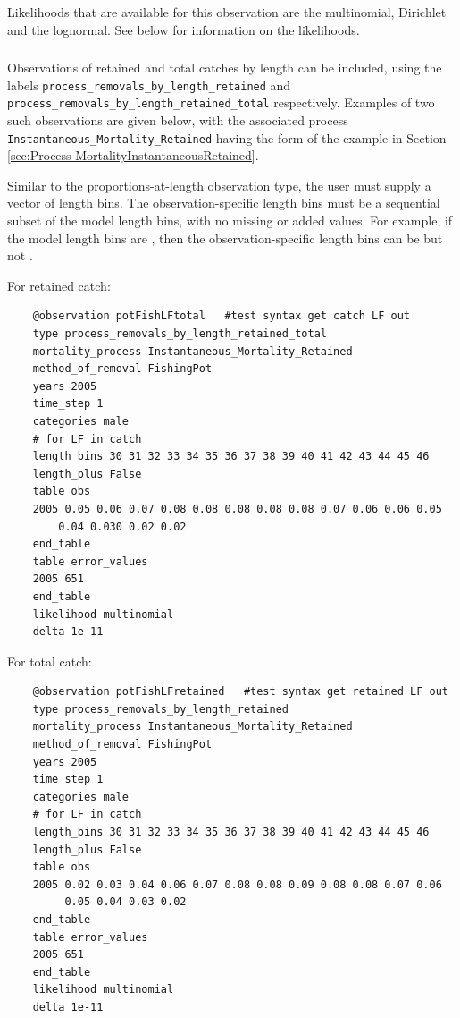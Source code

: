 Likelihoods that are available for this observation are the multinomial, Dirichlet and the lognormal. See below for information on the likelihoods.

\subsubsection{} \label{sec:Observation-ProcessRemovalsByLengthRetained} \label{sec:Observation-ProcessRemovalsByLengthRetainedTotal}

Observations of retained and total catches by length can be included, using the labels \texttt{process\_removals\_by\_length\_retained} and \texttt{process\_removals\_by\_length\_retained\_total} respectively. Examples of two such observations are given below, with the associated process \texttt{Instantaneous\_Mortality\_Retained} having the form of the example in Section \ref{sec:Process-MortalityInstantaneousRetained}.

Similar to the proportions-at-length observation type, the user must supply a vector of length bins. The observation-specific length bins must be a sequential subset of the model length bins, with no missing or added values. For example, if the model length bins are , then the observation-specific length bins can be  but not .

For retained catch:

{\small{\begin{verbatim}
	@observation potFishLFtotal   #test syntax get catch LF out
	type process_removals_by_length_retained_total
	mortality_process Instantaneous_Mortality_Retained
	method_of_removal FishingPot
	years 2005
	time_step 1
	categories male
	# for LF in catch
	length_bins 30 31 32 33 34 35 36 37 38 39 40 41 42 43 44 45 46 
	length_plus False
	table obs
	2005 0.05 0.06 0.07 0.08 0.08 0.08 0.08 0.08 0.07 0.06 0.06 0.05 
		0.04 0.030 0.02 0.02
	end_table
	table error_values
	2005 651
	end_table
	likelihood multinomial
	delta 1e-11
\end{verbatim}}}

For total catch:

{\small{\begin{verbatim}
	@observation potFishLFretained   #test syntax get retained LF out
	type process_removals_by_length_retained
	mortality_process Instantaneous_Mortality_Retained
	method_of_removal FishingPot
	years 2005
	time_step 1
	categories male
	# for LF in catch
	length_bins 30 31 32 33 34 35 36 37 38 39 40 41 42 43 44 45 46 
	length_plus False
	table obs
	2005 0.02 0.03 0.04 0.06 0.07 0.08 0.08 0.09 0.08 0.08 0.07 0.06 
	     0.05 0.04 0.03 0.02
	end_table
	table error_values
	2005 651
	end_table
	likelihood multinomial
	delta 1e-11
\end{verbatim}}}



